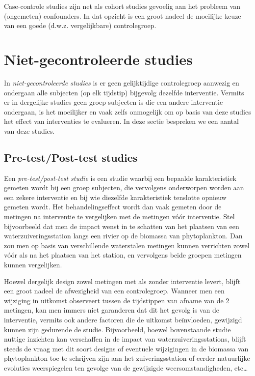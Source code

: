 \documentclass[
  12pt,dutch,coursenotes]{book}
\theoremstyle{definition}
\theoremstyle{definition}
\theoremstyle{definition}
\theoremstyle{remark}
\begin{document}
Case-controle studies zijn net als cohort studies gevoelig aan het probleem
van (ongemeten) confounders. In dat opzicht is een groot nadeel de moeilijke
keuze van een goede (d.w.z. vergelijkbare) controlegroep.

\hypertarget{niet-gecontroleerde-studies}{%
\section{Niet-gecontroleerde studies}\label{niet-gecontroleerde-studies}}

In \emph{niet-gecontroleerde studies} is er geen gelijktijdige controlegroep aanwezig en
ondergaan alle subjecten (op elk tijdstip) bijgevolg dezelfde interventie. Vermits er in
dergelijke studies geen groep subjecten is die een andere interventie
ondergaan, is het moeilijker en vaak zelfs onmogelijk om op basis van deze
studies het effect van interventies te evalueren. In deze sectie bespreken we een aantal van deze studies.

\hypertarget{subsec:prepost}{%
\subsection{Pre-test/Post-test studies}\label{subsec:prepost}}

Een \emph{pre-test/post-test studie} is een studie waarbij een bepaalde
karakteristiek gemeten wordt bij een groep subjecten, die vervolgens
onderworpen worden aan een zekere interventie en bij wie diezelfde
karakteristiek tenslotte opnieuw gemeten wordt. Het behandelingseffect wordt
dan vaak gemeten door de metingen na interventie te vergelijken met de
metingen vóór interventie.
Stel bijvoorbeeld dat men de impact wenst in te schatten van het plaatsen van een waterzuiveringsstation langs een rivier op de biomassa van phytoplankton. Dan zou men op basis van verschillende waterstalen metingen kunnen verrichten zowel vóór als na het plaatsen van het station, en vervolgens beide groepen metingen kunnen vergelijken.

Hoewel dergelijk design zowel metingen met als zonder interventie levert,
blijft een groot nadeel de afwezigheid van een controlegroep. Wanneer men
een wijziging in uitkomst observeert tussen de tijdstippen van afname van de
2 metingen, kan men immers niet garanderen dat dit het gevolg is van de
interventie, vermits ook andere factoren die de uitkomst beïnvloeden,
gewijzigd kunnen zijn gedurende de studie. Bijvoorbeeld, hoewel bovenstaande studie nuttige inzichten kan verschaffen in de impact van waterzuiveringsstations, blijft steeds de vraag met dit soort designs of eventuele wijzigingen in de biomassa van phytoplankton toe te schrijven zijn aan het zuiveringsstation of eerder natuurlijke evoluties weerspiegelen ten gevolge van de gewijzigde weersomstandigheden, etc\ldots{}
\end{document}
